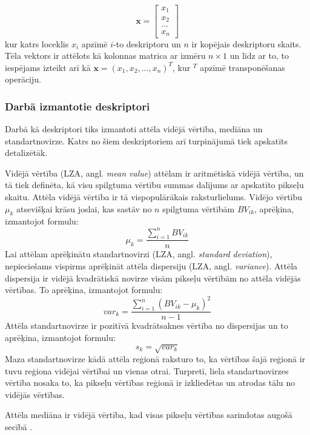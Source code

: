 \documentclass[12pt,paper=a4]{report}
\begin{document}
\begin{equation}
\textbf{x}=\begin{bmatrix}
x_1\\ 
x_2\\ 
...\\ 
x_n
\end{bmatrix}
\end{equation}
kur katrs loceklis $ x_i $ apzīmē $i$-to deskriptoru un $n$ ir kopējais deskriptoru skaits. Tēla vektors ir attēlots kā kolonnas matrica ar izmēru $n \times 1$ un līdz ar to, to iespējams izteikt arī kā $ \textbf{x}=(x_1, x_2, ..., x_n)^T $, kur $^T$ apzīmē transponēšanas operāciju. \cite{gonzalez2002digital} \par
\subsubsection{Darbā izmantotie deskriptori}
Darbā kā deskriptori tiks izmantoti attēla vidējā vērtība, mediāna un standartnovirze. Katrs no šiem deskriptoriem arī turpinājumā tiek apskatīts detalizētāk.\par
Vidējā vērtība (LZA, angl. \textit{mean value}) attēlam ir aritmētiskā vidējā vērtība, un tā tiek definēta, kā visu spilgtuma vērtību summas dalījums ar apskatīto pikseļu skaitu. Attēla vidējā vērtība ir tā vispopulārākais raksturlielums. Vidējo vērtību $\mu _k$ atsevišķai krāsu joslai, kas sastāv no $n$ spilgtuma vērtībām $BV_{ik}$, aprēķina, izmantojot formulu:
\begin{equation}
\mu _k=\frac{\sum_{i=1}^{n}BV_{ik}}{n}
\end{equation}
Lai attēlam aprēķinātu standartnovirzi (LZA, angl. \textit{standard deviation}), nepieciešams vispirms aprēķināt attēla dispersiju (LZA, angl. \textit{variance}). Attēla dispersija ir vidējā kvadrātiskā novirze visām pikseļu vērtībām no attēla vidējās vērtības. To aprēķina, izmantojot formulu:
\begin{equation}
var_k=\frac{\sum_{i=1}^{n}{(BV_{ik}-\mu_k)^2}}{n-1}
\end{equation}
Attēla standartnovirze ir pozitīvā kvadrātsaknes vērtība no dispersijas un to aprēķina, izmantojot formulu:
\begin{equation}
s_k=\sqrt{var_k}
\end{equation}
Maza standartnovirze kādā attēla reģionā raksturo to, ka vērtības šajā reģionā ir tuvu reģiona vidējai vērtībai un vienas otrai. Turpretī, liela standartnovirzes vērtība nosaka to, ka pikseļu vērtības reģionā ir izkliedētas un atrodas tālu no vidējās vērtības. \cite{stdMeanMedian}\par
Attēla mediāna ir vidējā vērtība, kad visas pikseļu vērtības sarindotas augošā secībā \cite{stdMeanMedian}.
\end{document}

